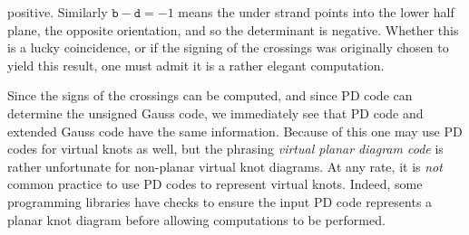         positive. Similarly $\texttt{b}-\texttt{d}=-1$ means the under strand
        points into the lower half plane, the opposite orientation, and so
        the determinant is negative. Whether this is a
        lucky coincidence, or if the signing of the crossings was originally
        chosen to yield this result, one must admit it is a rather elegant
        computation.
        \par\hfill\par
        Since the signs of the crossings can be computed, and since
        PD code can determine the unsigned Gauss code, we immediately see that
        PD code and extended Gauss code have the same information. Because of
        this one may use PD codes for virtual knots as well, but the phrasing
        \textit{virtual planar diagram code} is rather unfortunate for
        non-planar virtual knot diagrams. At any rate, it is \textit{not}
        common practice to use PD codes to represent virtual knots. Indeed,
        some programming libraries have checks to ensure the input PD code
        represents a planar knot diagram before allowing computations to be
        performed.
